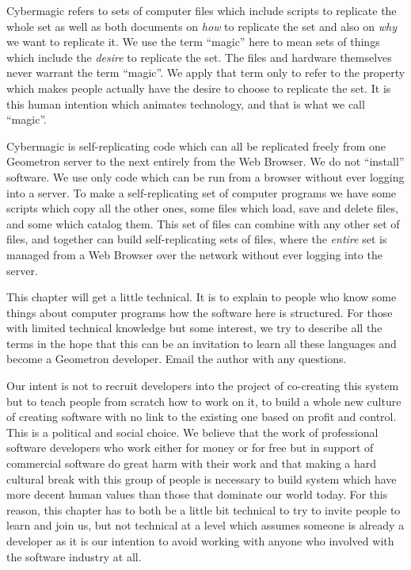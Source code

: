 

Cybermagic refers to sets of computer files which include scripts to
replicate the whole set as well as both documents on \emph{how} to
replicate the set and also on \emph{why} we want to replicate it. We use
the term ``magic'' here to mean sets of things which include the
\emph{desire} to replicate the set. The files and hardware themselves
never warrant the term ``magic''. We apply that term only to refer to
the property which makes people actually have the desire to choose to
replicate the set. It is this human intention which animates technology,
and that is what we call ``magic''.

Cybermagic is self-replicating code which can all be replicated freely
from one Geometron server to the next entirely from the Web Browser. We
do not ``install'' software. We use only code which can be run from a
browser without ever logging into a server. To make a self-replicating
set of computer programs we have some scripts which copy all the other
ones, some files which load, save and delete files, and some which
catalog them. This set of files can combine with any other set of files,
and together can build self-replicating sets of files, where the
\emph{entire} set is managed from a Web Browser over the network without
ever logging into the server.

This chapter will get a little technical. It is to explain to people who
know some things about computer programs how the software here is
structured. For those with limited technical knowledge but some
interest, we try to describe all the terms in the hope that this can be
an invitation to learn all these languages and become a Geometron
developer. Email the author with any questions.

Our intent is not to recruit developers into the project of co-creating
this system but to teach people from scratch how to work on it, to build
a whole new culture of creating software with no link to the existing
one based on profit and control. This is a political and social choice.
We believe that the work of professional software developers who work
either for money or for free but in support of commercial software do
great harm with their work and that making a hard cultural break with
this group of people is necessary to build system which have more decent
human values than those that dominate our world today. For this reason,
this chapter has to both be a little bit technical to try to invite
people to learn and join us, but not technical at a level which assumes
someone is already a developer as it is our intention to avoid working
with anyone who involved with the software industry at all.

